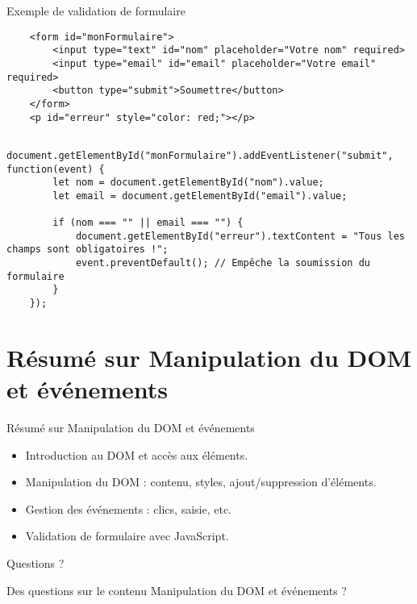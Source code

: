 \documentclass{beamer}
\begin{document}
    \begin{frame}[fragile]{Exemple de validation de formulaire}
    \begin{verbatim}
    <form id="monFormulaire">
        <input type="text" id="nom" placeholder="Votre nom" required>
        <input type="email" id="email" placeholder="Votre email" required>
        <button type="submit">Soumettre</button>
    </form>
    <p id="erreur" style="color: red;"></p>
    \end{verbatim}
    
    \begin{verbatim}
    document.getElementById("monFormulaire").addEventListener("submit", function(event) {
        let nom = document.getElementById("nom").value;
        let email = document.getElementById("email").value;
    
        if (nom === "" || email === "") {
            document.getElementById("erreur").textContent = "Tous les champs sont obligatoires !";
            event.preventDefault(); // Empêche la soumission du formulaire
        }
    });
    \end{verbatim}
    \end{frame}
    
    \section{Résumé sur Manipulation du DOM et événements}
    \begin{frame}{Résumé sur Manipulation du DOM et événements}
    \begin{itemize}
        \item Introduction au DOM et accès aux éléments.
        \item Manipulation du DOM : contenu, styles, ajout/suppression d'éléments.
        \item Gestion des événements : clics, saisie, etc.
        \item Validation de formulaire avec JavaScript.
    \end{itemize}
    \end{frame}
    
    \begin{frame}{Questions ?}
    \begin{center}
    \Large Des questions sur le contenu Manipulation du DOM et événements ?
    \end{center}
    \end{frame}
\end{document}

